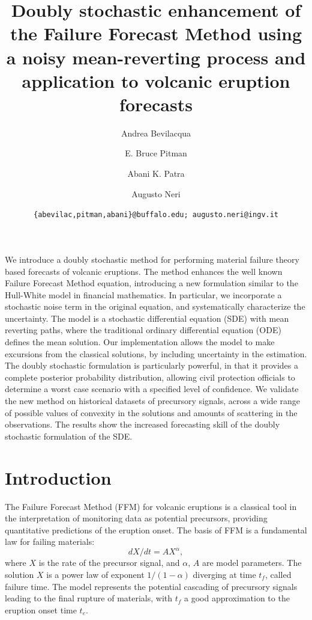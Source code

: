 \documentclass{article}
\begin{document}
\title{Doubly stochastic enhancement of the Failure Forecast Method using a noisy mean-reverting process and application to volcanic eruption forecasts}
\author[1]{Andrea Bevilacqua}
\author[2]{E. Bruce Pitman}
\author[3,4]{Abani K. Patra}
\author[5]{Augusto Neri}


\date{\texttt{\{abevilac,pitman,abani\}@buffalo.edu; augusto.neri@ingv.it}}


\maketitle
\abstract
We introduce a doubly stochastic method for performing material failure theory based forecasts of volcanic eruptions. The method enhances the well known Failure Forecast Method equation, introducing a new formulation similar to the Hull-White model in financial mathematics. In particular, we incorporate a stochastic noise term in the original equation, and systematically characterize the uncertainty. The model is a stochastic differential equation (SDE) with mean reverting paths, where the traditional ordinary differential equation (ODE) defines the mean solution. Our implementation allows the model to make excursions from the classical solutions, by including uncertainty in the estimation. The doubly stochastic formulation is particularly powerful, in that it provides a complete posterior probability distribution, allowing civil protection officials to determine a worst case scenario with a specified level of confidence. We validate the new method on historical datasets of precursory signals, across a wide range of possible values of convexity in the solutions and amounts of scattering in the observations. The results show the increased forecasting skill of the doubly stochastic formulation of the SDE.

\section{Introduction}
The Failure Forecast Method (FFM) for volcanic eruptions is a classical tool in the interpretation of monitoring data as potential precursors, providing quantitative predictions of the eruption onset. The basis of FFM is a fundamental law for failing materials:
$$dX/dt=AX^\alpha,$$
where $X$ is the rate of the precursor signal, and $\alpha$, $A$ are model parameters. The solution $X$ is a power law of exponent $1/(1-\alpha)$ diverging at time $t_f$, called failure time. The model represents the potential cascading of precursory signals leading to the final rupture of materials, with $t_f$ a good approximation to the eruption onset time $t_e$.
\end{document}
